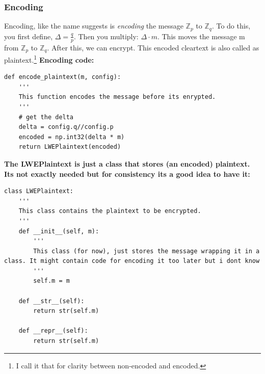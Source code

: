 \documentclass{report}
\begin{document}
\subsubsection{Encoding}
Encoding, like the name suggests is \textit{encoding} the message $\mathbb{Z}_p$ to $\mathbb{Z}_q$. To do this, you first define, $\Delta = \frac{q}{p}$. Then you multiply: $\Delta \cdot m$. This moves the message m from $\mathbb{Z}_p$ to $\mathbb{Z}_q$. After this, we can encrypt. This encoded cleartext is also called as plaintext.\footnote{I call it that for clarity between non-encoded and encoded.}
 \textbf{Encoding code:}
\begin{verbatim}
def encode_plaintext(m, config):
	'''
	This function encodes the message before its enrypted.
	'''
	# get the delta
	delta = config.q//config.p
	encoded = np.int32(delta * m)
	return LWEPlaintext(encoded)
\end{verbatim}

\textbf{The LWEPlaintext is just a class that stores (an encoded) plaintext. Its not exactly needed but for consistency its a good idea to have it:}
\begin{verbatim}
class LWEPlaintext:
	'''
	This class contains the plaintext to be encrypted.
	'''
	def __init__(self, m):
		'''
		This class (for now), just stores the message wrapping it in a class. It might contain code for encoding it too later but i dont know
		'''
		self.m = m
	
	def __str__(self):
		return str(self.m)
	
	def __repr__(self):
		return str(self.m)
\end{verbatim}
\end{document}
